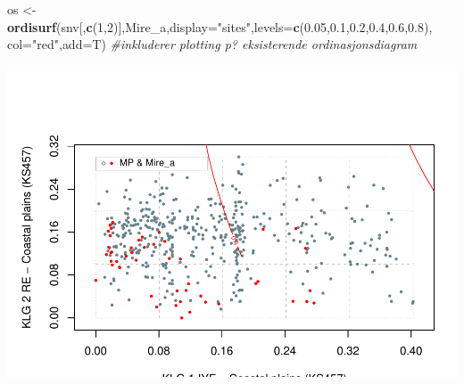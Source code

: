 \documentclass[]{article}
\newenvironment{Shaded}{\begin{snugshade}}{\end{snugshade}}
\newcommand{\CommentTok}[1]{\textcolor[rgb]{0.56,0.35,0.01}{\textit{#1}}}
\newcommand{\DataTypeTok}[1]{\textcolor[rgb]{0.13,0.29,0.53}{#1}}
\newcommand{\DecValTok}[1]{\textcolor[rgb]{0.00,0.00,0.81}{#1}}
\newcommand{\FloatTok}[1]{\textcolor[rgb]{0.00,0.00,0.81}{#1}}
\newcommand{\KeywordTok}[1]{\textcolor[rgb]{0.13,0.29,0.53}{\textbf{#1}}}
\newcommand{\NormalTok}[1]{#1}
\newcommand{\StringTok}[1]{\textcolor[rgb]{0.31,0.60,0.02}{#1}}
\begin{document}
\begin{Shaded}
\begin{Highlighting}[]
\NormalTok{os <-}\StringTok{ }\KeywordTok{ordisurf}\NormalTok{(snv[,}\KeywordTok{c}\NormalTok{(}\DecValTok{1}\NormalTok{,}\DecValTok{2}\NormalTok{)],Mire_a,}\DataTypeTok{display=}\StringTok{"sites"}\NormalTok{,}\DataTypeTok{levels=}\KeywordTok{c}\NormalTok{(}\FloatTok{0.05}\NormalTok{,}\FloatTok{0.1}\NormalTok{,}\FloatTok{0.2}\NormalTok{,}\FloatTok{0.4}\NormalTok{,}\FloatTok{0.6}\NormalTok{,}\FloatTok{0.8}\NormalTok{), }\DataTypeTok{col=}\StringTok{"red"}\NormalTok{,}\DataTypeTok{add=}\NormalTok{T) }\CommentTok{#inkluderer plotting p? eksisterende ordinasjonsdiagram}
\end{Highlighting}
\end{Shaded}

\includegraphics{Landscape_analysis_example_4_files/figure-latex/unnamed-chunk-45-1.pdf}
\end{document}
